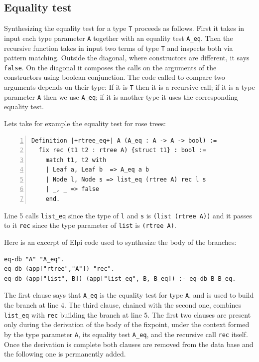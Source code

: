 \documentclass[a4paper,UKenglish,cleveref, autoref]{lipics-v2019}
\begin{document}
\subsection{Equality test} %

Synthesizing the equality test for a type \lstinline+T+ proceeds as follows.
First it takes in input each type parameter \lstinline+A+ together with
an equality test \lstinline+A_eq+.  Then the recursive function
takes in input two terms of type \lstinline+T+ and inspects both via
pattern matching.  Outside the diagonal, where constructors are
different, it says \lstinline+false+. On the diagonal it composes the
calls on the arguments of the constructors using boolean conjunction.
The code called to compare two arguments depends on their type: If it
is \lstinline+T+ then it is a recursive call; if it is a type
parameter \lstinline+A+ then we use \lstinline+A_eq+; if it is
another type it uses the corresponding equality test.

Lets take for example the equality test for rose trees:

\begin{lstlisting}[numbers=left]
Definition |+rtree_eq+| A (A_eq : A -> A -> bool) :=
  fix rec (t1 t2 : rtree A) {struct t1} : bool :=
    match t1, t2 with
    | Leaf a, Leaf b  => A_eq a b
    | Node l, Node s => list_eq (rtree A) rec l s
    | _, _ => false
    end.
\end{lstlisting}

\noindent
Line 5 calls \lstinline+list_eq+ since the type of \lstinline+l+ and
\lstinline+s+ is \lstinline+(list (rtree A))+ and it passes to it
\lstinline+rec+ since the type parameter of \lstinline+list+ is
\lstinline+(rtree A)+.

Here is an excerpt of Elpi code used to synthesize the body of the
branches:

\begin{lstlisting}
eq-db "A" "A_eq".
eq-db (app["rtree","A"]) "rec".
eq-db (app["list", B]) (app["list_eq", B, B_eq]) :- eq-db B B_eq.
\end{lstlisting}

\noindent
The first clause says that \lstinline+A_eq+ is the equality test for type
\lstinline+A+, and is used to build the branch at line 4.
The third clause, chained with the second one, combines
\lstinline+list_eq+ with \lstinline+rec+ building the branch at line
5.
The first two clauses are present only during the
derivation of the body of the fixpoint, under the context formed by
the type parameter \lstinline+A+, its equality test
\lstinline+A_eq+, and the recursive call \lstinline+rec+ itself. 
Once the derivation is complete both clauses are removed 
from the data base and the
following one is permanently added.
\end{document}
